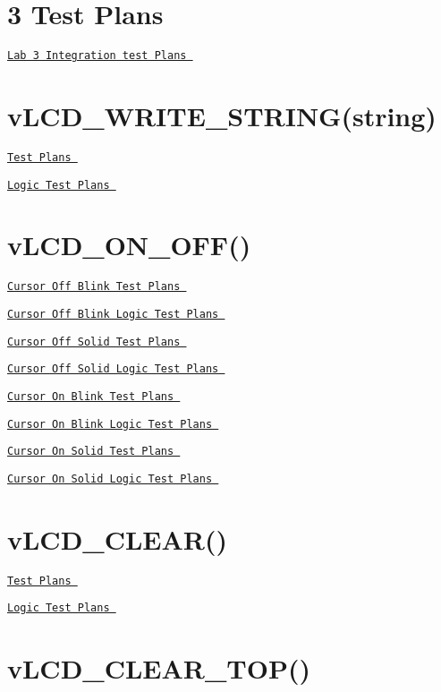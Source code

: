 \hypertarget{_test_plans_Lab}{}\section{3 Test Plans}\label{_test_plans_Lab}
\href{LAB3_TEST_PLANS.pdf}{\tt Lab 3 Integration test Plans }\hypertarget{_test_plans_string}{}\section{v\-L\-C\-D\-\_\-\-W\-R\-I\-T\-E\-\_\-\-S\-T\-R\-I\-N\-G(string)}\label{_test_plans_string}
\href{vLCD_PRINT_STRING_TESTPLAN.pdf}{\tt Test Plans } \par
 \href{vLCD_PRINT_STRING_LOGIC.pdf}{\tt Logic Test Plans }\hypertarget{_test_plans_onoff}{}\section{v\-L\-C\-D\-\_\-\-O\-N\-\_\-\-O\-F\-F()}\label{_test_plans_onoff}
\href{vLCD_ON_OFF_CURSOR_OFF_BLINK_TESTPLAN.pdf}{\tt Cursor Off Blink Test Plans } \par
 \href{vLCD_ON_OFF_CURSOR_OFF_BLINK_LOGIC.pdf}{\tt Cursor Off Blink Logic Test Plans } \par
 \href{vLCD_ON_OFF_CURSOR_OFF_SOLID_TESTPLAN.pdf}{\tt Cursor Off Solid Test Plans } \par
 \href{vLCD_ON_OFF_CURSOR_OFF_SOLID_LOGIC.pdf}{\tt Cursor Off Solid Logic Test Plans } \par
 \href{vLCD_ON_OFF_CURSOR_ON_BLINK_TESTPLAN.pdf}{\tt Cursor On Blink Test Plans } \par
 \href{vLCD_ON_OFF_CURSOR_ON_BLINK_LOGIC.pdf}{\tt Cursor On Blink Logic Test Plans } \par
 \href{vLCD_ON_OFF_CURSOR_ON_SOLID_TESTPLAN.pdf}{\tt Cursor On Solid Test Plans } \par
 \href{vLCD_ON_OFF_CURSOR_ON_SOLID_LOGIC.pdf}{\tt Cursor On Solid Logic Test Plans }\hypertarget{_test_plans_clear}{}\section{v\-L\-C\-D\-\_\-\-C\-L\-E\-A\-R()}\label{_test_plans_clear}
\href{vLCD_CLEAR_TESTPLAN.pdf}{\tt Test Plans } \par
 \href{vLCD_CLEAR_LOGIC.pdf}{\tt Logic Test Plans }\hypertarget{_test_plans_clear_top}{}\section{v\-L\-C\-D\-\_\-\-C\-L\-E\-A\-R\-\_\-\-T\-O\-P()}\label{_test_plans_clear_top}
